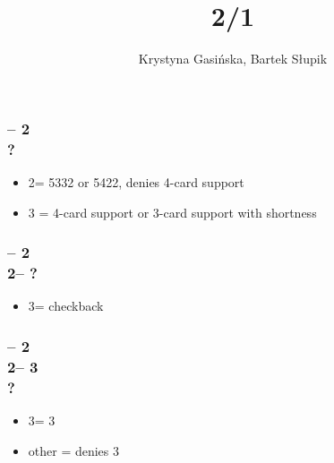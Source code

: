 \documentclass[12pt, a4paper]{article}
\title{2/1 \gf}
\author{Krystyna Gasińska, Bartek Słupik}
\begin{document}
\maketitle


\subsubsection*{ -- 2 \\ ?}
\begin{itemize}
    \item 2\nt = 5332 or 5422, denies 4-card support
    \item 3 = 4-card support or 3-card support with shortness
\end{itemize}

\subsubsection*{ -- 2 
                \\ 2\nt -- ?}
\begin{itemize}
    \item 3\clubs = checkback
\end{itemize}

\subsubsection*{ -- 2 
                \\ 2\nt -- 3\clubs \\ ?}
\begin{itemize}
    \item 3\diams = 3
    \item other = denies 3
\end{itemize}

\end{document}
